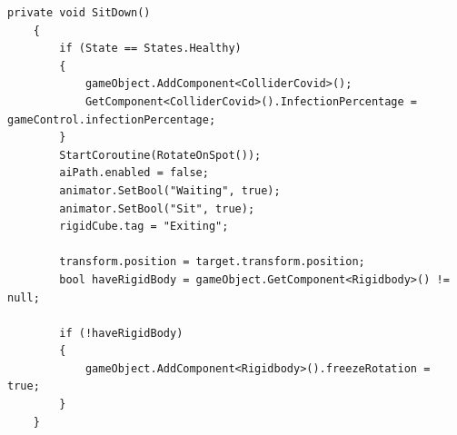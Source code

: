 \documentclass[12pt, openany]{book}
\begin{document}
\begin{lstlisting}[language={[Sharp]C}, caption={Metodo per la seduta degli agenti}, label={SitDown}]
	private void SitDown()
	{
		if (State == States.Healthy)
		{
			gameObject.AddComponent<ColliderCovid>();
			GetComponent<ColliderCovid>().InfectionPercentage = 	gameControl.infectionPercentage;
		}
		StartCoroutine(RotateOnSpot());
		aiPath.enabled = false;
		animator.SetBool("Waiting", true);
		animator.SetBool("Sit", true);
		rigidCube.tag = "Exiting";
		
		transform.position = target.transform.position;
		bool haveRigidBody = gameObject.GetComponent<Rigidbody>() != null;
		
		if (!haveRigidBody)
		{
			gameObject.AddComponent<Rigidbody>().freezeRotation = true;
		}
	}
\end{lstlisting}
\end{document}
